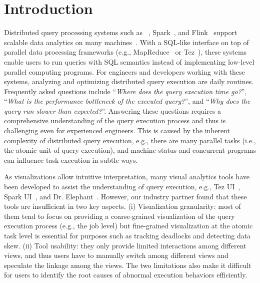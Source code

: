 \section{Introduction}\label{sec:intro}
Distributed query processing systems such as \hive{}~\cite{thusoo2009hive}, Spark~\cite{spark}, and Flink~\cite{carbone2015apache} support scalable data analytics on many machines~\cite{thusoo2009hive,thusoo2010hive}.
With a SQL-like interface on top of parallel data processing frameworks (e.g., MapReduce~\cite{hadoop} or Tez~\cite{saha2015apache}), these systems enable users to run queries with SQL semantics instead of implementing low-level parallel computing programs.
For engineers and developers working with these systems, analyzing and optimizing distributed query execution are daily routines. 
Frequently asked questions include ``\emph{Where does the query execution time go?}'', ``\emph{What is the performance bottleneck of the executed query?}'', and ``\emph{Why does the query run slower than expected?}''.
Answering these questions requires a comprehensive understanding of the query execution process and thus is challenging even for experienced engineers. 
This is caused by the inherent complexity of distributed query execution, e.g., there are many parallel tasks (i.e., the atomic unit of query execution), and machine status and concurrent programs can influence task execution in subtle ways.

As visualizations allow intuitive interpretation, many visual analytics tools have been developed to assist the understanding of query execution, e.g., Tez UI~\cite{tezui}, Spark UI~\cite{sparkui}, and Dr. Elephant~\cite{elephant}. 
However, our industry partner found that these tools are insufficient in two key aspects.
(i) \textsf{Visualization granularity}: 
most of them tend to focus on providing a coarse-grained visualization of the query execution process (e.g., the job level) but fine-grained visualization at the atomic task level is essential for purposes such as tracking deadlocks and detecting data skew.
(ii) \textsf{Tool usability}: they only provide limited interactions among different views, and thus users have to manually switch among different views and speculate the linkage among the views. The two limitations also make it difficult for users to identify the root causes of abnormal execution behaviors efficiently.



